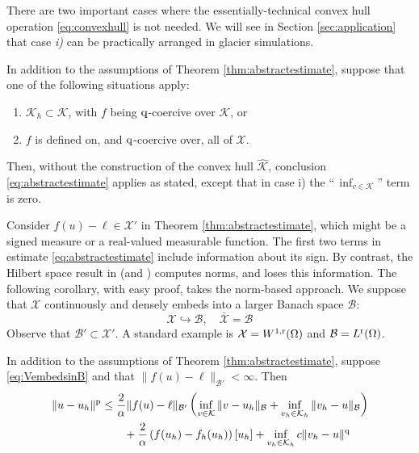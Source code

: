 \documentclass[hidelinks,onefignum,onetabnum,final]{siamart220329}  %
\newcommand{\cB}{\mathcal{B}}
\newcommand{\cK}{\mathcal{K}}
\newcommand{\cX}{\mathcal{X}}
\newcommand{\hcK}{\widehat{\cK}}
\newcommand{\pp}{{\text{\textnormal{p}}}}
\newcommand{\qq}{{\text{\textnormal{q}}}}
\newcommand{\rr}{{\text{\textnormal{r}}}}
\begin{document}
There are two important cases where the essentially-technical convex hull operation \eqref{eq:convexhull} is not needed.  We will see in Section \ref{sec:application} that case \emph{i)} can be practically arranged in glacier simulations.

\begin{corollary}  \label{cor:abstractestimate:nohull}  In addition to the assumptions of Theorem \ref{thm:abstractestimate}, suppose that one of the following situations apply:
\renewcommand{\labelenumi}{\roman{enumi})}
\begin{enumerate}
\item $\cK_h \subset \cK$, with $f$ being $\qq$-coercive over $\cK$, or
\item $f$ is defined on, and $\qq$-coercive over, all of $\cX$.
\end{enumerate}
Then, without the construction of the convex hull $\hcK$, conclusion \eqref{eq:abstractestimate} applies as stated, except that in case i) the ``\,$\inf_{v\in\cK}$'' term is zero.
\end{corollary}

Consider $f(u)-\ell\in \cX'$ in Theorem \ref{thm:abstractestimate}, which might be a signed measure or a real-valued measurable function.  The first two terms in estimate \eqref{eq:abstractestimate} include information about its sign.  By contrast, the Hilbert space result in \cite{Falk1974} (and \cite[section 5.1]{Ciarlet2002}) computes norms, and loses this information.  The following corollary, with easy proof, takes the norm-based approach.  We suppose that $\cX$ continuously and densely embeds into a larger Banach space $\cB$:
\begin{equation}
\cX \hookrightarrow \cB, \quad \bar{\cX} = \cB \label{eq:VembedsinB}
\end{equation}
Observe that $\cB' \subset \cX'$.  A standard example is $\cX=W^{1,\rr}(\Omega)$ and $\cB=L^\rr(\Omega)$.

\begin{corollary}  \label{cor:abstractestimate:Bnorm}  In addition to the assumptions of Theorem \ref{thm:abstractestimate}, suppose \eqref{eq:VembedsinB} and that $\|f(u)-\ell\|_{\cB'} < \infty$.  Then
\begin{align}
\|u-u_h\|^\pp &\le \frac{2}{\alpha} \|f(u)-\ell\|_{\cB'} \left( \inf_{v\in\cK} \|v-u_h\|_{\cB} +   \inf_{v_h\in\cK_h} \|v_h-u\|_{\cB} \right) \label{eq:abstractestimate:Bnorm} \\
   &\qquad + \frac{2}{\alpha} \left(f(u_h)-f_h(u_h)\right)[u_h] + \inf_{v_h\in\cK_h} c \|v_h - u\|^\qq \notag
\end{align}
\end{corollary}
\end{document}
